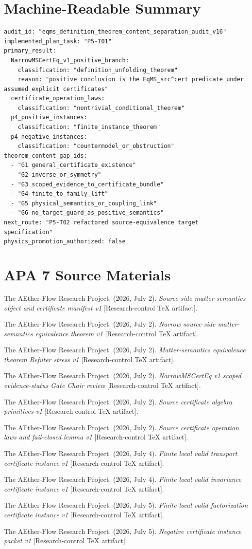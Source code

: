 \documentclass[11pt]{article}
\begin{document}
\section{Machine-Readable Summary}

\begin{verbatim}
audit_id: "eqms_definition_theorem_content_separation_audit_v16"
implemented_plan_task: "P5-T01"
primary_result:
  NarrowMSCertEq_v1_positive_branch:
    classification: "definition_unfolding_theorem"
    reason: "positive conclusion is the EqMS_src^cert predicate under assumed explicit certificates"
  certificate_operation_laws:
    classification: "nontrivial_conditional_theorem"
  p4_positive_instances:
    classification: "finite_instance_theorem"
  p4_negative_instances:
    classification: "countermodel_or_obstruction"
theorem_content_gap_ids:
  - "G1 general_certificate_existence"
  - "G2 inverse_or_symmetry"
  - "G3 scoped_evidence_to_certificate_bundle"
  - "G4 finite_to_family_lift"
  - "G5 physical_semantics_or_coupling_link"
  - "G6 no_target_guard_as_positive_semantics"
next_route: "P5-T02 refactored source-equivalence target specification"
physics_promotion_authorized: false
\end{verbatim}

\section{APA 7 Source Materials}

The AEther-Flow Research Project. (2026, July 2). \textit{Source-side
matter-semantics object and certificate manifest v1} [Research-control TeX
artifact].

The AEther-Flow Research Project. (2026, July 2). \textit{Narrow source-side
matter-semantics equivalence theorem v1} [Research-control TeX artifact].

The AEther-Flow Research Project. (2026, July 2). \textit{Matter-semantics
equivalence theorem Refuter stress v1} [Research-control TeX artifact].

The AEther-Flow Research Project. (2026, July 2). \textit{NarrowMSCertEq v1
scoped evidence-status Gate Chair review} [Research-control TeX artifact].

The AEther-Flow Research Project. (2026, July 2). \textit{Source certificate
algebra primitives v1} [Research-control TeX artifact].

The AEther-Flow Research Project. (2026, July 2). \textit{Source certificate
operation laws and fail-closed lemma v1} [Research-control TeX artifact].

The AEther-Flow Research Project. (2026, July 4). \textit{Finite local valid
transport certificate instance v1} [Research-control TeX artifact].

The AEther-Flow Research Project. (2026, July 4). \textit{Finite local valid
invariance certificate instance v1} [Research-control TeX artifact].

The AEther-Flow Research Project. (2026, July 5). \textit{Finite local valid
factorization certificate instance v1} [Research-control TeX artifact].

The AEther-Flow Research Project. (2026, July 5). \textit{Negative certificate
instance packet v1} [Research-control TeX artifact].
\end{document}
